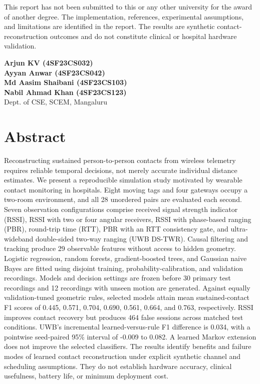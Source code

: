 \documentclass[12pt,a4paper]{report}
\begin{document}
\noindent This report has not been submitted to this or any other university for the award of another degree. The implementation, references, experimental assumptions, and limitations are identified in the report. The results are synthetic contact-reconstruction outcomes and do not constitute clinical or hospital hardware validation.
\vspace{.4in}
\begin{flushleft}
\textbf{Arjun KV (4SF23CS032)}\\[12pt]
\textbf{Ayyan Anwar (4SF23CS042)}\\[12pt]
\textbf{Md Aasim Shaibani (4SF23CS103)}\\[12pt]
\textbf{Nabil Ahmad Khan (4SF23CS123)}\\[12pt]
Dept. of CSE, SCEM, Mangaluru
\end{flushleft}
\clearpage
\pagestyle{plain}
\chapter*{Abstract}
Reconstructing sustained person-to-person contacts from wireless telemetry requires reliable temporal decisions, not merely accurate individual distance estimates. We present a reproducible simulation study motivated by wearable contact monitoring in hospitals. Eight moving tags and four gateways occupy a two-room environment, and all 28 unordered pairs are evaluated each second. Seven observation configurations comprise received signal strength indicator (RSSI), RSSI with two or four angular receivers, RSSI with phase-based ranging (PBR), round-trip time (RTT), PBR with an RTT consistency gate, and ultra-wideband double-sided two-way ranging (UWB DS-TWR). Causal filtering and tracking produce 29 observable features without access to hidden geometry. Logistic regression, random forests, gradient-boosted trees, and Gaussian naive Bayes are fitted using disjoint training, probability-calibration, and validation recordings. Models and decision settings are frozen before 30 primary test recordings and 12 recordings with unseen motion are generated. Against equally validation-tuned geometric rules, selected models attain mean sustained-contact F1 scores of 0.445, 0.571, 0.704, 0.690, 0.561, 0.664, and 0.763, respectively. RSSI improves contact recovery but produces 464 false sessions across matched test conditions. UWB's incremental learned-versus-rule F1 difference is 0.034, with a pointwise seed-paired 95\% interval of -0.009 to 0.082. A learned Markov extension does not improve the selected classifiers. The results identify benefits and failure modes of learned contact reconstruction under explicit synthetic channel and scheduling assumptions. They do not establish hardware accuracy, clinical usefulness, battery life, or minimum deployment cost.
\end{document}
